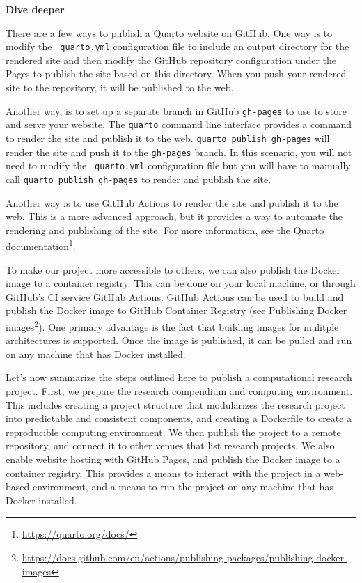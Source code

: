 \documentclass[
  letterpaper,
]{latex/krantz}
\theoremstyle{definition}
\theoremstyle{remark}
\DeclareRobustCommand{\href}[2]{#2\footnote{\url{#1}}}
\begin{document}
\begin{tcolorbox}[enhanced jigsaw, breakable, leftrule=.75mm, arc=.35mm, colframe=quarto-callout-color-frame, colback=white, left=2mm, bottomrule=.15mm, rightrule=.15mm, toprule=.15mm, opacityback=0]

\textbf{ Dive deeper}

There are a few ways to publish a Quarto website on GitHub. One way is
to modify the \texttt{\_quarto.yml} configuration file to include an
output directory for the rendered site and then modify the GitHub
repository configuration under the Pages to publish the site based on
this directory. When you push your rendered site to the repository, it
will be published to the web.

Another way, is to set up a separate branch in GitHub \texttt{gh-pages}
to use to store and serve your website. The \texttt{quarto} command line
interface provides a command to render the site and publish it to the
web. \texttt{quarto\ publish\ gh-pages} will render the site and push it
to the \texttt{gh-pages} branch. In this scenario, you will not need to
modify the \texttt{\_quarto.yml} configuration file but you will have to
manually call \texttt{quarto\ publish\ gh-pages} to render and publish
the site.

Another way is to use GitHub Actions to render the site and publish it
to the web. This is a more advanced approach, but it provides a way to
automate the rendering and publishing of the site. For more information,
see the \href{https://quarto.org/docs/}{Quarto documentation}.

\end{tcolorbox}

To make our project more accessible to others, we can also publish the
Docker image to a container registry. This can be done on your local
machine, or through GitHub's CI service GitHub Actions. GitHub Actions
can be used to build and publish the Docker image to GitHub Container
Registry (see
\href{https://docs.github.com/en/actions/publishing-packages/publishing-docker-images}{Publishing
Docker images}). One primary advantage is the fact that building images
for mulitple architectures is supported. Once the image is published, it
can be pulled and run on any machine that has Docker installed.

Let's now summarize the steps outlined here to publish a computational
research project. First, we prepare the research compendium and
computing environment. This includes creating a project structure that
modularizes the research project into predictable and consistent
components, and creating a Dockerfile to create a reproducible computing
environment. We then publish the project to a remote repository, and
connect it to other venues that list research projects. We also enable
website hosting with GitHub Pages, and publish the Docker image to a
container registry. This provides a means to interact with the project
in a web-based environment, and a means to run the project on any
machine that has Docker installed.
\end{document}
